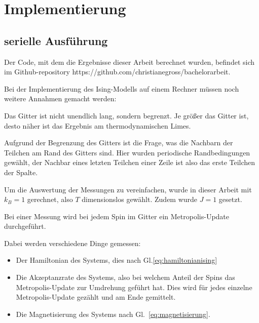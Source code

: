 	\chapter{Implementierung}
	\label{chap:implementierung}
	
	\section{serielle Ausführung}
	\label{sec:seriellimplementierung}
	
	Der Code, mit dem die Ergebnisse dieser Arbeit berechnet wurden, befindet sich im Github-repository https://github.com/christianegross/bachelorarbeit. %
	
	Bei der Implementierung des Ising-Modells auf einem Rechner müssen noch weitere Annahmen gemacht werden:
	
	Das Gitter ist nicht unendlich lang, sondern begrenzt. Je größer das Gitter ist, desto näher ist das Ergebnis am thermodynamischen Limes. 
	
	Aufgrund der Begrenzung des Gitters ist die Frage, was die Nachbarn der Teilchen am Rand des Gitters sind. Hier wurden periodische Randbedingungen gewählt, der Nachbar eines letzten Teilchen einer Zeile ist also das erste Teilchen der Spalte.
	
	Um die Auswertung der Messungen zu vereinfachen, wurde in dieser Arbeit mit $k_B=1$ gerechnet, also $T$ dimensionslos gewählt. Zudem wurde $J=1$ gesetzt.
	
	Bei einer Messung wird bei jedem Spin im Gitter ein Metropolis-Update durchgeführt.%
	
	Dabei werden verschiedene Dinge gemessen: \begin{itemize}
		\item Der Hamiltonian des Systems, dies nach Gl.\ref{eq:hamiltonianising}
		\item Die Akzeptanzrate des Systems, also bei welchem Anteil der Spins das Metropolis-Update zur Umdrehung geführt hat. Dies wird für jedes einzelne Metropolis-Update gezählt und am Ende gemittelt.
		\item Die Magnetisierung des Systems nach Gl.~\ref{eq:magnetisierung}. 
	\end{itemize}
	
